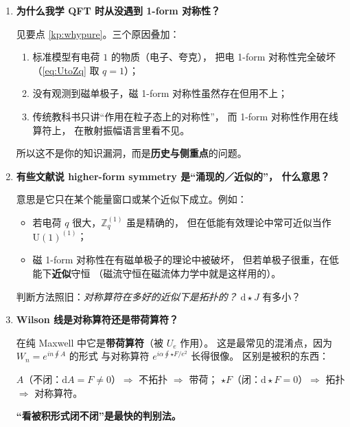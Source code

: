 \documentclass[UTF8,a4paper,11pt]{ctexart}
\theoremstyle{plain}
\theoremstyle{definition}
\theoremstyle{remark}
\newcommand{\ext}{\mathrm{d}}          %
\newcommand{\hs}{\star}                %
\newcommand{\ZZ}{\mathbb{Z}}
\newcommand{\Uone}{\mathrm{U}(1)}
\newcommand{\en}[1]{\textsf{#1}}       %
\newcommand{\Uop}{U}
\begin{document}
\begin{enumerate}[label=\textbf{Q\arabic*.},ref=\arabic*,leftmargin=1.3cm]
对，$q=d-1$ 时对称算符维数是 $d-(d-1)-1=0$，即支撑在\textbf{时空点}上。
这意味着存在\textbf{局域的拓扑算符}。

这种情形很特殊：局域拓扑算符 $\Uop(x)$ 因拓扑性而与位置无关，
可以同时对角化，其本征值\textbf{标记了互不通信的“宇宙”}
（\en{universes}）——理论\textbf{分解}（\en{decomposition}）成若干
超选择扇区。带荷对象是 $(d-1)$ 维的，即畴壁。

物理例子：2 维 $\Uone$ 规范理论、
或存在拓扑 $\theta$ 项且真空按 $\theta$ 标记的情形。
第一次听课不必深究，但要认得这个词。

\item \textbf{为什么我学 QFT 时从没遇到 1-form 对称性？}
\label{q:whynever}

见要点 \ref{kp:whypure}。三个原因叠加：
\begin{enumerate}[label=(\roman*)]
  \item 标准模型有电荷 $1$ 的物质（电子、夸克），
        把电 1-form 对称性完全破坏（\eqref{eq:UtoZq} 取 $q=1$）；
  \item 没有观测到磁单极子，磁 1-form 对称性虽然存在但用不上；
  \item 传统教科书只讲“作用在粒子态上的对称性”，
        而 1-form 对称性作用在线算符上，
        在散射振幅语言里看不见。
\end{enumerate}
所以这不是你的知识漏洞，而是\textbf{历史与侧重点}的问题。

\item \textbf{有些文献说 higher-form symmetry 是“涌现的／近似的”，
什么意思？}
\label{q:emergent}

意思是它只在某个能量窗口或某个近似下成立。例如：
\begin{itemize}
  \item 若电荷 $q$ 很大，$\ZZ_q^{(1)}$ 虽是精确的，
        但在低能有效理论中常可近似当作 $\Uone^{(1)}$；
  \item 磁 1-form 对称性在有磁单极子的理论中被破坏，
        但若单极子很重，在低能下\textbf{近似}守恒
        （磁流守恒在磁流体力学中就是这样用的）。
\end{itemize}
判断方法照旧：\emph{对称算符在多好的近似下是拓扑的？}
$\ext\hs J$ 有多小？

\item \textbf{Wilson 线是对称算符还是带荷算符？}
\label{q:wilsonrole}

在纯 Maxwell 中它是\textbf{带荷算符}（被 $\Uop_e$ 作用）。
这是最常见的混淆点，因为 $W_n=e^{in\oint A}$ 的形式
与对称算符 $e^{i\alpha\oint \hs F/e^2}$ 长得很像。
区别是被积的东西：
\begin{center}
$A$（不闭：$\ext A=F\ne0$）$\Rightarrow$ 不拓扑 $\Rightarrow$ 带荷；\qquad
$\hs F$（闭：$\ext\hs F=0$）$\Rightarrow$ 拓扑 $\Rightarrow$ 对称算符。
\end{center}
\textbf{“看被积形式闭不闭”是最快的判别法。}


\end{enumerate}
\end{document}
